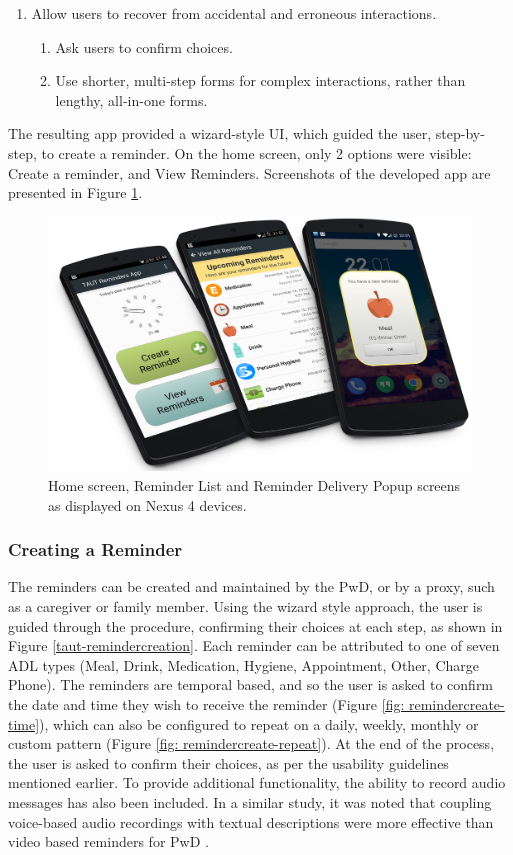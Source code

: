 \begin{enumerate}
 	\item Allow users to recover from accidental and erroneous interactions.
 	\begin{enumerate}
		\item Ask users to confirm choices.
		\item Use shorter, multi-step forms for complex interactions, rather than lengthy, all-in-one forms.
 	\end{enumerate}
\end{enumerate}

The resulting app provided a wizard-style UI, which guided the user, step-by-step, to create a reminder. On the home screen, only 2 options were visible: Create a reminder, and View Reminders. Screenshots of the developed app are presented in Figure \ref{fig: taut-devices}.

\begin{figure}[h]
    \centering
        \includegraphics[scale=0.13, angle=0]{Files/treatment-study-1/figures/device-app-screenshots}
        \caption{Home screen, Reminder List and Reminder Delivery Popup screens as displayed on Nexus 4 devices.}
        \label{fig: taut-devices}
\end{figure}

\subsubsection{Creating a Reminder}
The reminders can be created and maintained by the PwD, or by a proxy, such as a caregiver or family member. Using the wizard style approach, the user is guided through the procedure, confirming their choices at each step, as shown in Figure \ref{taut-remindercreation}. Each reminder can be attributed to one of seven ADL types (Meal, Drink, Medication, Hygiene, Appointment, Other, Charge Phone).
The reminders are temporal based, and so the user is asked to confirm the date and time they wish to receive the reminder (Figure \ref{fig: remindercreate-time}), which can also be configured to repeat on a daily, weekly, monthly or custom pattern (Figure \ref{fig: remindercreate-repeat}). At the end of the process, the user is asked to confirm their choices, as per the usability guidelines mentioned earlier.
To provide additional functionality, the ability to record audio messages has also been included. In a similar study, it was noted that coupling voice-based audio recordings with textual descriptions were more effective than video based reminders for PwD \cite{ONeill2010}.

